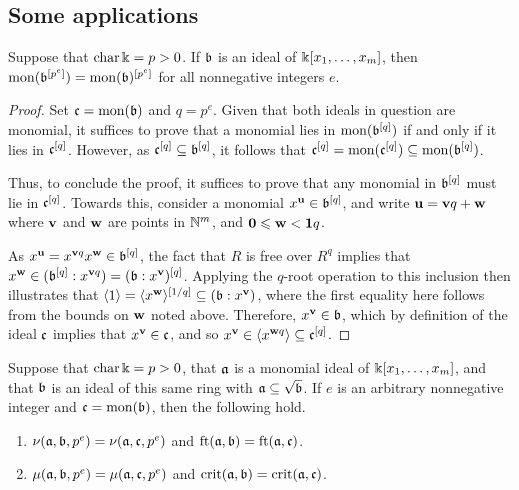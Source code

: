 \documentclass[11pt]{amsart}
\begin{document}
\subsection{Some applications}


\begin{lemma} \label{frobenius-powers+mon-commute: L}
Suppose that $\operatorname{char} \Bbbk = p > 0$.  If $\mathfrak{b}$ is an ideal of $\Bbbk[x_1, \ldots, x_m]$, then $\operatorname{mon}(\mathfrak{b}^{[p^e]}) = \operatorname{mon}(\mathfrak{b})^{[p^e]}$ for all nonnegative integers $e$.
\end{lemma}

\begin{proof}  Set $\mathfrak{c} = \operatorname{mon}(\mathfrak{b})$ and $q=p^e$.  Given that both ideals in question are monomial, it suffices to prove that a monomial lies in $\operatorname{mon}(\mathfrak{b}^{[q]})$ if and only if it lies in $\mathfrak{c}^{[q]}$.  However, as $\mathfrak{c}^{[q]} \subseteq \mathfrak{b}^{[q]}$, it follows that
$\mathfrak{c}^{[q]} = \operatorname{mon}(\mathfrak{c}^{[q]}) \subseteq \operatorname{mon}(\mathfrak{b}^{[q]})$.

Thus, to conclude the proof, it suffices to prove that any monomial in $\mathfrak{b}^{[q]}$ must lie in $\mathfrak{c}^{[q]}$.  Towards this, consider a monomial $x^{\mathbf{u}} \in \mathfrak{b}^{[q]}$, and write $\mathbf{u} = \mathbf{v}q + \mathbf{w}$ where $\mathbf{v}$ and $\mathbf{w}$ are points in $\mathbb{N}^m$, and $\mathbf{0} \leqslant \mathbf{w} < \mathbf{1}q$.

As $x^{\mathbf{u}} = x^{\mathbf{v}q} x^{\mathbf{w}} \in \mathfrak{b}^{[q]}$, the fact that $R$ is free over $R^q$ implies that $x^{\mathbf{w}} \in ( \mathfrak{b}^{[q]}: x^{\mathbf{v}q}) = (\mathfrak{b}:x^{\mathbf{v}})^{[q]}$.  Applying the $q$-root operation to this inclusion then illustrates that $\langle 1 \rangle = \langle x^{\mathbf{w}} \rangle^{[1/q]}  \subseteq (\mathfrak{b}: x^{\mathbf{v}})$,  where the first equality here follows from the bounds on $\mathbf{w}$ noted above.   Therefore, $x^{\mathbf{v}} \in \mathfrak{b}$, which by definition of the ideal $\mathfrak{c}$ implies that $x^{\mathbf{v}} \in \mathfrak{c}$, and so $x^{\mathbf{v}} \in \langle x^{\mathbf{w}q} \rangle \subseteq \mathfrak{c}^{[q]}$.
\end{proof}


\begin{corollary}
\label{reduce-to-monomial-case: C}
Suppose that $\operatorname{char} \Bbbk = p > 0$, that $\mathfrak{a}$ is a monomial ideal of $\Bbbk[x_1, \ldots, x_m]$, and that $\mathfrak{b}$ is an ideal of this same ring with $\mathfrak{a} \subseteq \sqrt{\mathfrak{b}}$.  If $e$ is an arbitrary nonnegative integer and $\mathfrak{c} = \operatorname{mon}(\mathfrak{b})$, then the following hold.
\begin{enumerate}
\item $\nu(\mathfrak{a}, \mathfrak{b}, p^e) = \nu(\mathfrak{a}, \mathfrak{c}, p^e)$ and $\operatorname{ft}(\mathfrak{a}, \mathfrak{b}) = \operatorname{ft}(\mathfrak{a}, \mathfrak{c})$.
\item $\mu(\mathfrak{a}, \mathfrak{b}, p^e) = \mu(\mathfrak{a}, \mathfrak{c}, p^e)$ and $\operatorname{crit}(\mathfrak{a},\mathfrak{b}) = \operatorname{crit}(\mathfrak{a},\mathfrak{c})$. 
\end{enumerate}
\end{corollary}
\end{document}
